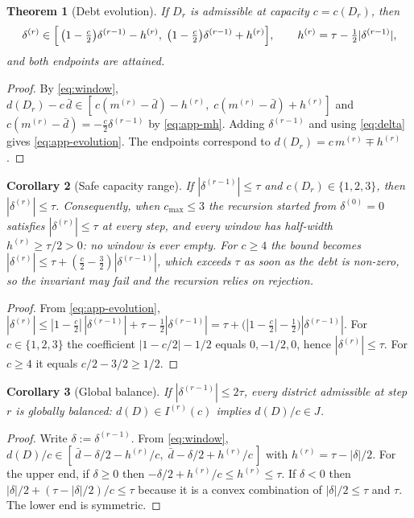 \documentclass[11pt]{article}
\newtheorem{theorem}{Theorem}[section]
\newtheorem{corollary}[theorem]{Corollary}
\theoremstyle{definition}
\begin{document}
\begin{theorem}[Debt evolution]\label{thm:app-evolution}\label{thm:debt-evol}\label{thm:correctness}
If $D_r$ is admissible at capacity $c=c(D_r)$, then
\begin{equation}\label{eq:app-evolution}
  \delta^{(r)}\in\Bigl[\,\bigl(1-\tfrac{c}{2}\bigr)\delta^{(r-1)}-h^{(r)},\;
                       \bigl(1-\tfrac{c}{2}\bigr)\delta^{(r-1)}+h^{(r)}\Bigr],
  \qquad h^{(r)}=\tau-\tfrac12|\delta^{(r-1)}|,
\end{equation}
and both endpoints are attained.
\end{theorem}
\begin{proof}
By \eqref{eq:window}, $d(D_r)-c\,\bar d\in
[\,c(m^{(r)}-\bar d)-h^{(r)},\;c(m^{(r)}-\bar d)+h^{(r)}]$ and
$c(m^{(r)}-\bar d)=-\tfrac{c}{2}\delta^{(r-1)}$ by \eqref{eq:app-mh}. Adding $\delta^{(r-1)}$ and using \eqref{eq:delta} gives \eqref{eq:app-evolution}. The endpoints correspond to $d(D_r)=c\,m^{(r)}\mp h^{(r)}$.
\end{proof}

\begin{corollary}[Safe capacity range]\label{cor:app-invariant}\label{cor:envelope}
If $|\delta^{(r-1)}|\le\tau$ and $c(D_r)\in\{1,2,3\}$, then
$|\delta^{(r)}|\le\tau$. Consequently, when $c_{\max}\le 3$ the recursion
started from $\delta^{(0)}=0$ satisfies $|\delta^{(r)}|\le\tau$ at every
step, and every window has half-width $h^{(r)}\ge\tau/2>0$: no window is
ever empty. For $c\ge 4$ the bound becomes $|\delta^{(r)}|\le\tau+(\tfrac{c}{2}-\tfrac32)|\delta^{(r-1)}|$, which exceeds $\tau$ as soon as the debt is non-zero, so the invariant may fail and the recursion relies on rejection.
\end{corollary}
\begin{proof}
From \eqref{eq:app-evolution},
$|\delta^{(r)}|\le|1-\tfrac{c}{2}|\,|\delta^{(r-1)}|+\tau-\tfrac12|\delta^{(r-1)}|
 =\tau+\bigl(|1-\tfrac{c}{2}|-\tfrac12\bigr)|\delta^{(r-1)}|$. For
$c\in\{1,2,3\}$ the coefficient $|1-c/2|-1/2$ equals $0,-1/2,0$, hence
$|\delta^{(r)}|\le\tau$. For $c\ge4$ it equals $c/2-3/2\ge 1/2$.
\end{proof}

\begin{corollary}[Global balance]\label{cor:app-containment}
If $|\delta^{(r-1)}|\le 2\tau$, every district admissible at step $r$ is
globally balanced: $d(D)\in I^{(r)}(c)$ implies $d(D)/c\in J$.
\end{corollary}
\begin{proof}
Write $\delta:=\delta^{(r-1)}$. From \eqref{eq:window},
$d(D)/c\in[\,\bar d-\delta/2-h^{(r)}/c,\;\bar d-\delta/2+h^{(r)}/c\,]$ with
$h^{(r)}=\tau-|\delta|/2$. For the upper end, if $\delta\ge0$ then
$-\delta/2+h^{(r)}/c\le h^{(r)}\le\tau$. If $\delta<0$ then
$|\delta|/2+(\tau-|\delta|/2)/c\le\tau$ because it is a convex combination of
$|\delta|/2\le\tau$ and $\tau$. The lower end is symmetric.
\end{proof}
\end{document}

